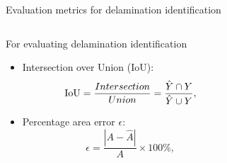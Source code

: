 \documentclass[10pt,aspectratio=169,dvipsnames]{beamer} %
\begin{document}
\begin{frame}{Evaluation metrics for delamination identification}
	\begin{columns}[T]
		\begin{column}{0.45\textwidth}
			For evaluating delamination identification
			\begin{itemize}
				\item Intersection over Union (IoU): %
				\begin{equation*}
					\textup{IoU}=\frac{Intersection}{Union}=\frac{\hat{Y} \cap Y}{\hat{Y} \cup Y},
					\label{eqn:iou}
				\end{equation*}
				\item Percentage area error $\epsilon$:
				\begin{equation*}
					\epsilon=\frac{|A-\hat{A}|}{A} \times 100\%,
					\label{eqn:mean_size_error}
				\end{equation*}
			\end{itemize}
		\end{column}		
		\begin{column}{0.45\textwidth}
			\begin{figure}
			\end{figure}
		\end{column}
	\end{columns}
\end{frame}


%
\end{document}
